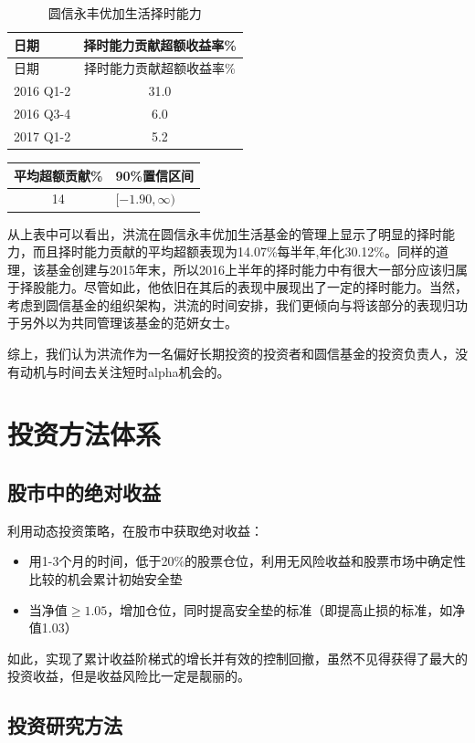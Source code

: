 \documentclass[hyperref,]{ctexart}
\begin{document}
\begin{longtable}[]{@{}lc@{}}
\caption{圆信永丰优加生活择时能力}\tabularnewline
\toprule
日期 & 择时能力贡献超额收益率\%\tabularnewline
\midrule
\endfirsthead
\toprule
日期 & 择时能力贡献超额收益率\%\tabularnewline
\midrule
\endhead
2016 Q1-2 & 31.0\tabularnewline
2016 Q3-4 & 6.0\tabularnewline
2017 Q1-2 & 5.2\tabularnewline
\bottomrule
\end{longtable}

\begin{longtable}[]{@{}cl@{}}
\toprule
平均超额贡献\% & 90\%置信区间\tabularnewline
\midrule
\endhead
14 & \([-1.90,\infty)\)\tabularnewline
\bottomrule
\end{longtable}

从上表中可以看出，洪流在圆信永丰优加生活基金的管理上显示了明显的择时能力，而且择时能力贡献的平均超额表现为14.07\%每半年,年化30.12\%。同样的道理，该基金创建与2015年末，所以2016上半年的择时能力中有很大一部分应该归属于择股能力。尽管如此，他依旧在其后的表现中展现出了一定的择时能力。当然，考虑到圆信基金的组织架构，洪流的时间安排，我们更倾向与将该部分的表现归功于另外以为共同管理该基金的范妍女士。

综上，我们认为洪流作为一名偏好长期投资的投资者和圆信基金的投资负责人，没有动机与时间去关注短时alpha机会的。

\section{投资方法体系}

\subsection{股市中的绝对收益}

利用动态投资策略，在股市中获取绝对收益：

\begin{itemize}
\item
  用1-3个月的时间，低于20\%的股票仓位，利用无风险收益和股票市场中确定性比较的机会累计初始安全垫
\item
  当净值\(\geq 1.05\)，增加仓位，同时提高安全垫的标准（即提高止损的标准，如净值1.03）
\end{itemize}

如此，实现了累计收益阶梯式的增长并有效的控制回撤，虽然不见得获得了最大的投资收益，但是收益风险比一定是靓丽的。

\subsection{投资研究方法}
\end{document}
